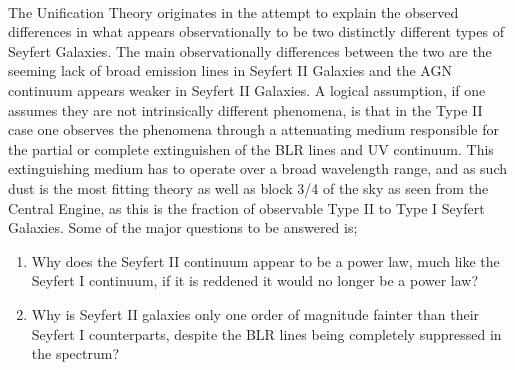 \documentclass[a4paper, 12pt, twoside]{article}
\begin{document}
\\
The Unification Theory originates in the attempt to explain the observed differences in what appears observationally to be two distinctly different types of Seyfert Galaxies. The main observationally differences between the two are the seeming lack of broad emission lines in Seyfert II Galaxies and the AGN continuum appears weaker in Seyfert II Galaxies. A logical assumption, if one assumes they are not intrinsically different phenomena, is that in the Type II case one observes the phenomena through a attenuating medium responsible for the partial or complete extinguishen of the BLR lines and UV continuum. This extinguishing medium has to operate over a broad wavelength range, and as such dust is the most fitting theory as well as block 3/4 of the sky as seen from the Central Engine, as this is the fraction of observable Type II to Type I Seyfert Galaxies. Some of the major questions to be answered is;
\begin{enumerate}
\item Why does the Seyfert II continuum appear to be a power law, much like the Seyfert I continuum, if it is reddened it would no longer be a power law?
\item Why is Seyfert II galaxies only one order of magnitude fainter than their Seyfert I counterparts, despite the BLR lines being completely suppressed in the spectrum?
\end{enumerate}
\end{document}
